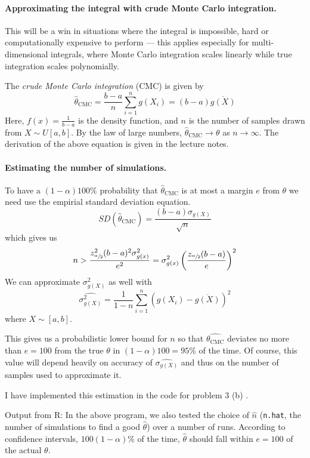 \documentclass[a4paper,english,12pt]{article}
\begin{document}
\paragraph{Approximating the integral with crude Monte Carlo integration.}

This will be a win in situations where the integral is impossible, hard or
computationally expensive to perform --- this applies especially for
multi-dimensional integrals, where Monte Carlo integration scales linearly
while true integration scales polynomially.

The \textit{crude Monte Carlo integration} (CMC) is given by
\[
  \hat{\theta}_{\textrm{CMC}} = \frac{b-a}{n} \sum_{i=1}^{n} g(X_i) =
  (b-a)\overline{g(X)}
\]
Here, $f(x) = \frac{1}{b-a}$ is the density function, and $n$ is the number of
samples drawn from $X \sim U[a,b]$. By the law of large numbers,
$\hat{\theta}_{\textrm{CMC}} \to \theta$ as $n \to \infty$. The derivation of the above
equation is given in the lecture notes.

\paragraph{Estimating the number of simulations.}

To have a $(1 - \alpha) 100\%{}$ probability that $\hat{\theta}_{\textrm{CMC}}$
is at most a margin $e$ from $\theta$ we need use the empirial standard
deviation equation.
\[
  SD(\hat{\theta}_{\textrm{CMC}}) = \frac{(b - a)\sigma_{g(X)}}{\sqrt{n}}
\]
which gives us
\[
  n > \frac{z_{\sfrac{\alpha}{2}}^2 (b - a)^2 \sigma_{g(x)}^2 }{e^2}
    = \sigma_{g(x)}^2
        \left(
            \frac{z_{\sfrac{\alpha}{2}}(b - a)}{e}
          \right)^2
\]
We can approximate $\sigma_{g(X)}^2$ as well with
\[
  \widehat{\sigma_{g(X)}^2} = \frac{1}{1 - n} \sum_{i=1}^n \left(
        g(X_i) - \overline{g(X)} \right)^2
\]
where $X \sim [a, b]$.

This gives us a probabilistic lower bound for $n$ so that
$\hat{\theta_{\textrm{CMC}}}$ deviates no more than $e = 100$ from the true
$\theta$ in $(1 - \alpha)100 = 95\%{}$ of the time. Of course, this value will
depend heavily on accuracy of $\widehat{\sigma_{g(X)}}$ and thus on the number
of samples used to approximate it.

I have implemented this estimation in the code for problem 3 (b)
.

\label{problem:3b}
Output from R:
In the above program, we also tested the choice of $\hat{n}$ (\texttt{n.hat},
the number of simulations to find a good $\hat{\theta}$) over a number of runs.
According to confidence intervals, $100(1 - \alpha)\%{}$ of the time,
$\hat{\theta}$ should fall within $e = 100$ of the actual $\theta$.
\end{document}
